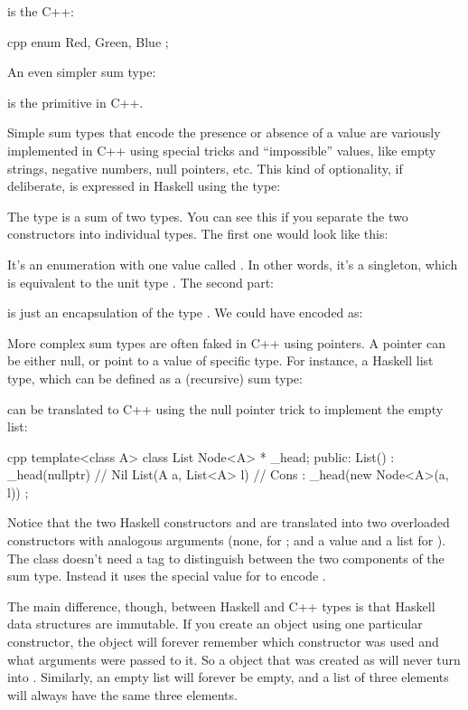 is the C++:

\begin{snip}{cpp}
enum { Red, Green, Blue };
\end{snip}
An even simpler sum type:

is the primitive  in C++.

Simple sum types that encode the presence or absence of a value are
variously implemented in C++ using special tricks and ``impossible''
values, like empty strings, negative numbers, null pointers, etc. This
kind of optionality, if deliberate, is expressed in Haskell using the
 type:

The  type is a sum of two types. You can see this if you
separate the two constructors into individual types. The first one would
look like this:

It's an enumeration with one value called . In other
words, it's a singleton, which is equivalent to the unit type
\code{()}. The second part:

is just an encapsulation of the type . We could have encoded
 as:

More complex sum types are often faked in C++ using pointers. A pointer
can be either null, or point to a value of specific type. For instance,
a Haskell list type, which can be defined as a (recursive) sum type:

can be translated to C++ using the null pointer trick to implement the
empty list:

\begin{snip}{cpp}
template<class A>
class List { 
    Node<A> * _head;
public:
    List() : _head(nullptr) {} // Nil
    List(A a, List<A> l)       // Cons
      : _head(new Node<A>(a, l))
    {}
};
\end{snip}
Notice that the two Haskell constructors  and 
are translated into two overloaded  constructors with
analogous arguments (none, for ; and a value and a list for
). The  class doesn't need a tag to
distinguish between the two components of the sum type. Instead it uses
the special  value for  to encode
.

The main difference, though, between Haskell and C++ types is that
Haskell data structures are immutable. If you create an object using one
particular constructor, the object will forever remember which
constructor was used and what arguments were passed to it. So a
 object that was created as  will
never turn into . Similarly, an empty list will forever
be empty, and a list of three elements will always have the same three
elements.

